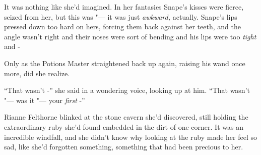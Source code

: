 It was nothing like she'd imagined. In her fantasies Snape's kisses were
fierce, seized from her, but this was "--- it was just \emph{awkward,}
actually. Snape's lips pressed down too hard on hers, forcing them back
against her teeth, and the angle wasn't right and their noses were sort
of bending and his lips were too \emph{tight} and -

Only as the Potions Master straightened back up again, raising his wand
once more, did she realize.

``That wasn't -'' she said in a wondering voice, looking up at him.
``That wasn't "--- was it "--- your \emph{first} -''

Rianne Felthorne blinked at the stone cavern she'd discovered, still
holding the extraordinary ruby she'd found embedded in the dirt of one
corner. It was an incredible windfall, and she didn't know why looking
at the ruby made her feel so sad, like she'd forgotten something,
something that had been precious to her.
